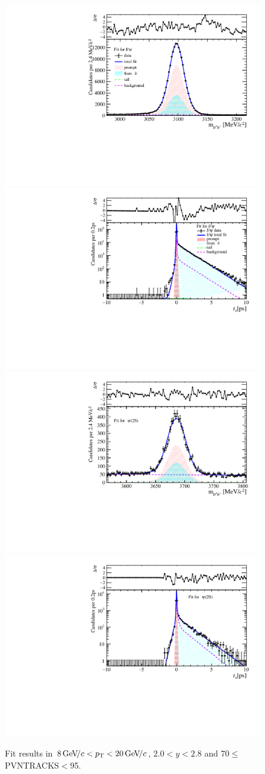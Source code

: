 \begin{figure}[H]
\begin{center}
\includegraphics[width=0.47\linewidth]{pdf/Jpsi/drawmass/n4y1pt5.pdf}
\includegraphics[width=0.47\linewidth]{pdf/Jpsi/2DFit/n4y1pt5.pdf}
\vspace*{-0.5cm}
\includegraphics[width=0.47\linewidth]{pdf/Psi2S/drawmass/n4y1pt5.pdf}
\includegraphics[width=0.47\linewidth]{pdf/Psi2S/2DFit/n4y1pt5.pdf}
\vspace*{-0.5cm}
\end{center}
\caption{Fit results in $8\text{\,Ge\kern -0.1em V\!/}c<p_{\mathrm{T}}<20\text{\,Ge\kern -0.1em V\!/}c$, $2.0<y<2.8$ and 70$\leq$PVNTRACKS$<$95.}
\label{Fitn4y1pt5}
\end{figure}
